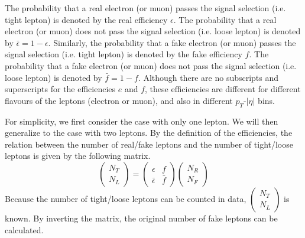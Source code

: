 The probability that a real electron (or muon) passes the signal selection (i.e. tight lepton) is denoted by the real efficiency $\epsilon$.
The probability that a real electron (or muon) does not pass the signal selection (i.e. loose lepton) is denoted by $\bar{\epsilon} = 1 - \epsilon$.
Similarly, the probability that a fake electron (or muon) passes the signal selection (i.e. tight lepton) is denoted by the fake efficiency $f$.
The probability that a fake electron (or muon) does not pass the signal selection (i.e. loose lepton) is denoted by $\bar{f} = 1 - f$.
Although there are no subscripts and superscripts for the efficiencies $e$ and $f$, these efficiencies are different for different flavours of the leptons (electron or muon), and also in different $p_T$-$|\eta|$ bins.

For simplicity, we first consider the case with only one lepton. We will then generalize to the case with two leptons.
By the definition of the efficiencies, the relation between the number of real/fake leptons and the number of tight/loose leptons is given by the following matrix.
\begin{equation}
\left( \begin{array}{c}
N_T \\
N_L
\end{array} \right)
=
\left( \begin{array}{cc}
\epsilon & f \\
\bar{\epsilon} & \bar{f}
\end{array} \right)
\left( \begin{array}{c}
N_R \\
N_F
\end{array} \right)
\label{equ:fake_eff_def}
\end{equation}
Because the number of tight/loose leptons can be counted in data, $\left( \begin{array}{c}
N_T \\
N_L
\end{array} \right)$ is known.
By inverting the matrix, the original number of fake leptons can be calculated.
